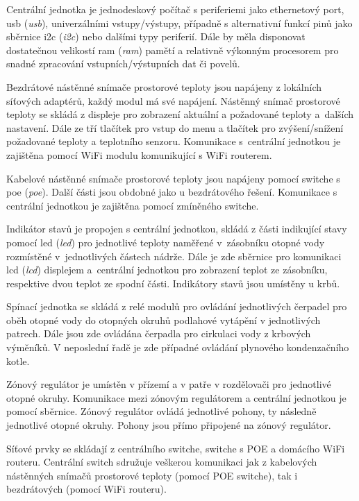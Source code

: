 Centrální jednotka je jednodeskový počítač s periferiemi jako ethernetový port, \acrshort{usb} (\textit{\acrlong{usb}}), univerzálními vstupy/výstupy, případně s alternativní funkcí pinů jako sběrnice \acrshort{i2c} (\textit{\acrlong{i2c}}) nebo dalšími typy periferií. Dále by měla disponovat dostatečnou velikostí \acrshort{ram} (\textit{\acrlong{ram}}) pamětí a relativně výkonným procesorem pro snadné zpracování vstupních/výstupních dat či povelů.

Bezdrátové nástěnné snímače prostorové teploty jsou napájeny z lokálních síťových adaptérů, každý modul má své napájení. Nástěnný snímač prostorové teploty se skládá z displeje pro zobrazení aktuální a požadované teploty a~dalších nastavení. Dále ze tří tlačítek pro vstup do menu a tlačítek pro zvýšení/snížení požadované teploty a teplotního senzoru. Komunikace s~centrální jednotkou je zajištěna pomocí WiFi modulu komunikující s WiFi routerem.

Kabelové nástěnné snímače prostorové teploty jsou napájeny pomocí switche s  \acrshort{poe} (\textit{\acrlong{poe}}). Další části jsou obdobné jako u bezdrátového řešení. Komunikace s centrální jednotkou je zajištěna pomocí zmíněného switche.

Indikátor stavů je propojen s centrální jednotkou, skládá z části indikující stavy pomocí \acrshort{led} (\textit{\acrlong{led}}) pro jednotlivé teploty naměřené v~zásobníku otopné vody rozmístěné v~jednotlivých částech nádrže. Dále je zde sběrnice pro komunikaci \acrshort{lcd} (\textit{\acrlong{lcd}}) displejem a~centrální jednotkou pro zobrazení teplot ze zásobníku, respektive dvou teplot ze spodní části. Indikátory stavů jsou umístěny u krbů.

Spínací jednotka se skládá z relé modulů pro ovládání jednotlivých čerpadel pro oběh otopné vody do otopných okruhů podlahové vytápění v jednotlivých patrech. Dále jsou zde ovládána čerpadla pro cirkulaci vody z krbových výměníků. V neposlední řadě je zde případné ovládání plynového kondenzačního kotle.

Zónový regulátor je umístěn v přízemí a v patře v rozdělovači pro jednotlivé otopné okruhy. Komunikace mezi zónovým regulátorem a centrální jednotkou je pomocí sběrnice. Zónový regulátor ovládá jednotlivé pohony, ty následně jednotlivé otopné okruhy. Pohony jsou přímo připojené na zónový regulátor.

Síťové prvky se skládají z centrálního switche, switche s POE a domácího WiFi routeru. Centrální switch sdružuje veškerou komunikaci jak z kabelových nástěnných snímačů prostorové teploty (pomocí POE switche), tak i bezdrátových (pomocí WiFi routeru). 

